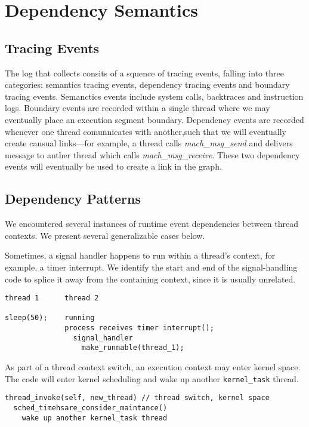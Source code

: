 \section{Dependency Semantics}
\subsection{Tracing Events}
The log that \xxx collects consits of a squence of tracing events, falling into three categories:
semantics tracing events, dependency tracing events and boundary tracing events.
Semanctics events include system calls, backtraces and instruction logs.
Boundary events are recorded within a single thread where we may eventually place an execution segment boundary.
Dependency events are recorded whenever one thread comunnicates with another,such that we will eventually create causual links---for example, a thread calls \textit{mach\_msg\_send} and delivers message to anther thread which calls \textit{mach\_msg\_receive}. These two dependency events will eventually be used to create a link in the graph.


\subsection{Dependency Patterns}
\label{sec:patterns}

We encountered several instances of runtime event dependencies between thread
contexts. We present several generalizable cases below.

Sometimes, a signal handler happens to run within a thread's context, for
example, a timer interrupt. We identify the start and end of the
signal-handling code to splice it away from the containing context, since it is
usually unrelated.

{\footnotesize \begin{verbatim}
thread 1      thread 2

sleep(50);    running
              process receives timer interrupt();
                signal_handler
                  make_runnable(thread_1);
\end{verbatim}
}

As part of a thread context switch, an execution context may enter kernel
space. The code will enter kernel scheduling and wake up another
\texttt{kernel\_task} thread.

{\footnotesize \begin{verbatim}
thread_invoke(self, new_thread) // thread switch, kernel space
  sched_timehsare_consider_maintance()
    wake up another kernel_task thread
\end{verbatim}
}

